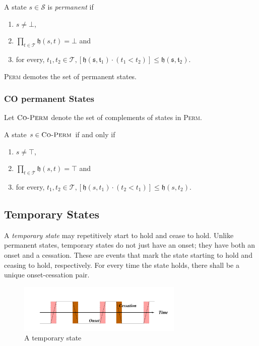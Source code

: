 \begin{defn}
  A state $s \in \mathcal{S}$ is \textit{permanent} if
  \begin{enumerate}
    \item $s \neq \bot$,
    \item $\displaystyle \prod_{t \in \mathcal{T}} \mathfrak{h}(s, t) = \bot$ and
    \item for every, $t_1, t_2 \in \mathcal{T}, [\mathfrak{h(s, t_1)} \cdot (t_1 < t_2)] \leq \mathfrak{h(s, t_2)}$.
  \end{enumerate}
\end{defn}

\textsc{Perm} demotes the set of permanent states.

\subsubsection{CO permanent States}
Let $\textsc{Co-Perm}$ denote the set of complements of states in \textsc{Perm}.

A state $s \in \textsc{Co-Perm}$ if and only if
\begin{enumerate}
  \item $s \neq \top$,
  \item $\displaystyle \prod_{t \in \mathcal{T}} \mathfrak{h}(s, t) = \top$ and
  \item for every, $t_1, t_2 \in \mathcal{T}, [\mathfrak{h}(s, t_1) \cdot (t_2 < t_1)] \leq \mathfrak{h}(s, t_2)$.
\end{enumerate}


\subsection{Temporary States}
A \textit{temporary state} may repetitively start to hold and cease to hold. Unlike
permanent states, temporary states do not just have an onset; they have both an onset and a cessation.
These are events that mark the state starting to hold and ceasing to hold, respectively. For every time
the state holds, there shall be a unique onset-cessation pair.

\begin{figure}[H]
  \centering
  \includegraphics[width=0.7\textwidth]{images/temp-states.png}
  \caption{A temporary state}
  \label{fig:temporary}
\end{figure}

